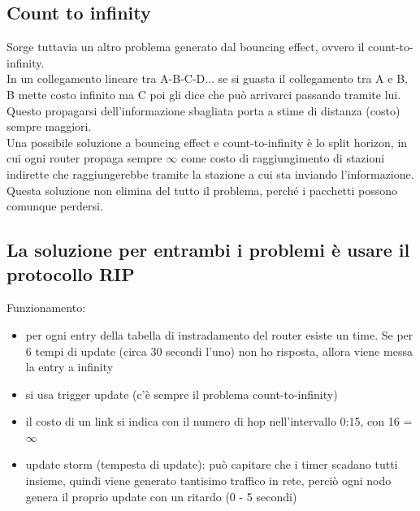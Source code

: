 \documentclass[11pt, oneside]{article}   	%
\begin{document}
\subsection*{Count to infinity}
Sorge tuttavia un altro problema generato dal bouncing effect, ovvero il count-to-infinity.\\
In un collegamento lineare tra A-B-C-D... se si guasta il collegamento tra A e B, B mette costo infinito ma C poi gli dice che può arrivarci passando tramite lui. Questo propagarsi dell'informazione sbagliata porta a stime di distanza (costo) sempre maggiori.\\
Una possibile soluzione a bouncing effect e count-to-infinity è lo split horizon, in cui ogni router propaga sempre $\infty$ come costo di raggiungimento di stazioni indirette che raggiungerebbe tramite la stazione a cui sta inviando l'informazione. Questa soluzione non elimina del tutto il problema, perché i pacchetti possono comunque perdersi.

\subsection*{La soluzione per entrambi i problemi è usare il protocollo RIP} 
Funzionamento:
\begin{itemize}
\item per ogni entry della tabella di instradamento del router esiste un time. Se per 6
tempi di update (circa 30 secondi l'uno) non ho risposta, allora viene messa la entry a infinity
\item si usa trigger update (c'è sempre il problema count-to-infinity)
\item il costo di un link si indica con il numero di hop nell'intervallo 0:15, con 16 = $\infty$
\item update storm (tempesta di update): può capitare che i timer scadano tutti insieme, quindi viene generato tantisimo traffico in rete, perciò ogni nodo genera il proprio update con un ritardo (0 - 5 secondi)
\end{itemize}
\end{document}
